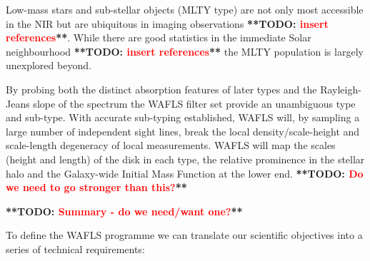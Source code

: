 \documentclass[12pt]{article}
\newcommand{\todo}[1]{\textbf{**TODO: \textcolor{red}{#1}**}}
\begin{document}
Low-mass stars and sub-stellar objects (MLTY type) are not only most accessible in the NIR but are ubiquitous in imaging observations \todo{insert references}. While there are good statistics in the immediate Solar neighbourhood \todo{insert references} the MLTY population is largely unexplored beyond.  

By probing both the distinct absorption features of later types and the Rayleigh-Jeans slope of the spectrum the WAFLS filter set provide an unambiguous type and sub-type. With accurate sub-typing established, WAFLS will, by sampling a large number of independent sight lines, break the local density/scale-height and scale-length degeneracy of local measurements. WAFLS will map the scales (height and length) of the disk in each type, the relative prominence in the stellar halo and the Galaxy-wide Initial Mass Function at the lower end. \todo{Do we need to go stronger than this?}

\todo{Summary - do we need/want one?}







%
%
\justifyobservations   %


To define the WAFLS programme we can translate our scientific objectives into a series of technical requirements:
\end{document}

